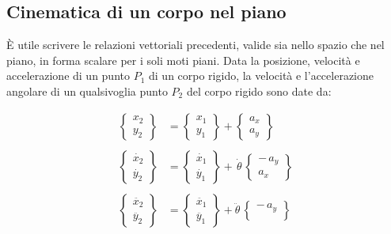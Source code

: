 				\subsection{Cinematica di un corpo nel piano}
		
				È utile scrivere le relazioni vettoriali precedenti, valide sia nello spazio che nel piano, in forma scalare per i soli moti piani. Data la posizione, velocità e accelerazione di un punto $P_1$ di un corpo rigido, la velocità e l'accelerazione angolare di un qualsivoglia punto $P_2$ del corpo rigido sono date da:
				
		\begin{minipage}{.45\textwidth}
			\begin{align*}
			\begin{Bmatrix}
				x_2\\
				y_2
			\end{Bmatrix}
			&= 
			\begin{Bmatrix}
				x_1\\
				y_1
			\end{Bmatrix}
			+
			\begin{Bmatrix}
				a_x\\
				a_y
			\end{Bmatrix}\\
			\\
			\begin{Bmatrix}
				\dot{x_2}\\
				\dot{y_2}
			\end{Bmatrix}
			&= 
			\begin{Bmatrix}
				\dot{x_1}\\
				\dot{y_1}
			\end{Bmatrix}
			+ \, \dot{\theta}\,
			\begin{Bmatrix}
				-\, a_y\\
				a_x
			\end{Bmatrix}\\
			\\
				\begin{Bmatrix}
				\ddot{x_2}\\
				\ddot{y_2}
			\end{Bmatrix} & =
										\begin{Bmatrix}
											\ddot{x_1}\\
											\ddot{y_1}
										\end{Bmatrix}
										+ \ddot{\theta} \,
										\begin{Bmatrix}
											- \, a_y\\

\end{Bmatrix}
\end{align*}
\end{minipage}
